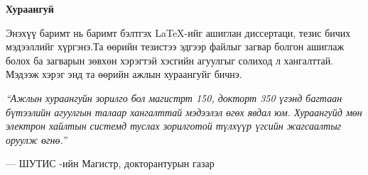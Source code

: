 \begin{center}
\textbf{\large Хураангуй}
\end{center}

Энэхүү баримт нь баримт бэлтгэх \LaTeX -ийг ашиглан диссертаци, тезис бичих мэдээллийг хүргэнэ.Та өөрийн тезистээ эдгээр файлыг загвар болгон ашиглаж болох ба загварын зөвхөн хэрэгтэй хэсгийн агуулгыг солиход л хангалттай. Мэдээж хэрэг энд та өөрийн ажлын хураангуйг бичнэ.

\vspace{1cm}

\emph{``Ажлын хураангуйн зорилго бол магистрт 150, докторт 350 үгэнд багтаан бүтээлийн агуулгын талаар хангалттай мэдээлэл өгөх явдал юм. Хураангуйд мөн электрон хайлтын системд туслах зорилготой түлхүүр үгсийн жагсаалтыг оруулж өгнө.''}

\hfill --- ШУТИС -ийн Магистр, докторантурын газар
